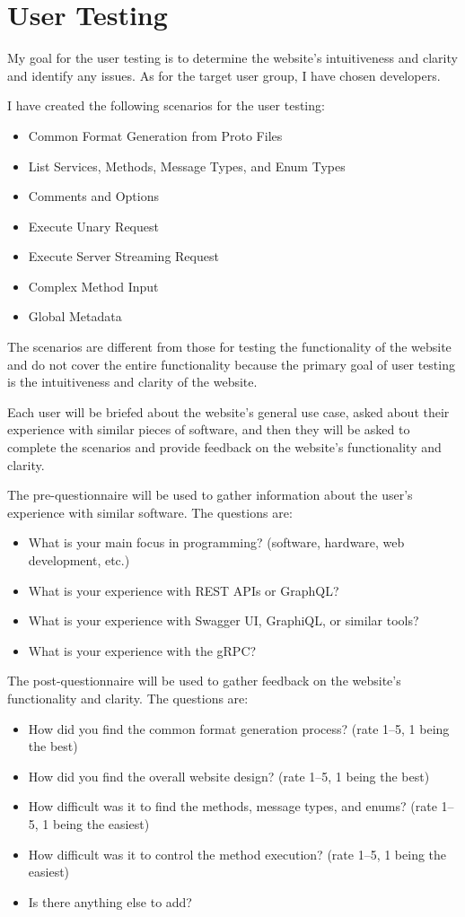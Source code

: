 \section{User Testing}
My goal for the user testing is to determine the website's intuitiveness and clarity and identify any issues.
As for the target user group, I have chosen developers.

I have created the following scenarios for the user testing:
\begin{itemize}
    \item Common Format Generation from Proto Files
    \item List Services, Methods, Message Types, and Enum Types
    \item Comments and Options
    \item Execute Unary Request
    \item Execute Server Streaming Request
    \item Complex Method Input
    \item Global Metadata
\end{itemize}

The scenarios are different from those for testing the functionality of the website
and do not cover the entire functionality
because the primary goal of user testing is the intuitiveness and clarity of the website.

Each user will be briefed about the website's general use case,
asked about their experience with similar pieces of software,
and then they will be asked to complete the scenarios
and provide feedback on the website's functionality and clarity.

The pre-questionnaire will be used to gather information about the user's experience with similar software.
The questions are:
\begin{itemize}
    \item What is your main focus in programming?
    (software, hardware, web development, etc.)
    \item What is your experience with REST APIs or GraphQL?
    \item What is your experience with Swagger UI, GraphiQL, or similar tools?
    \item What is your experience with the gRPC?
\end{itemize}

The post-questionnaire will be used to gather feedback on the website's functionality and clarity.
The questions are:
\begin{itemize}
    \item How did you find the common format generation process?
    (rate 1--5, 1 being the best)
    \item How did you find the overall website design?
    (rate 1--5, 1 being the best)
    \item How difficult was it to find the methods, message types, and enums?
    (rate 1--5, 1 being the easiest)
    \item How difficult was it to control the method execution?
    (rate 1--5, 1 being the easiest)
    \item Is there anything else to add?
\end{itemize}

